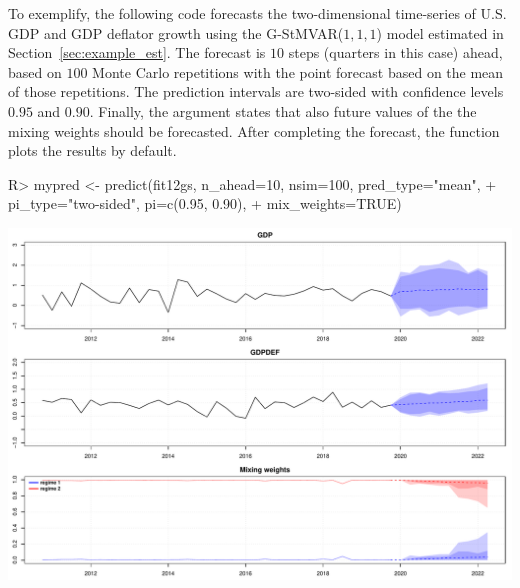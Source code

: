 \documentclass[nojss]{jss} %
\begin{document}
To exemplify, the following code forecasts the two-dimensional time-series of U.S. GDP and GDP deflator growth using the G-StMVAR($1, 1, 1$) model  estimated in Section~\ref{sec:example_est}. The forecast is $10$ steps (quarters in this case) ahead, based on $100$ Monte Carlo repetitions with the point forecast based on the mean of those repetitions. The prediction intervals are two-sided with confidence levels $0.95$ and $0.90$. Finally, the argument  states that also future values of the the mixing weights should be forecasted. After completing the forecast, the function plots the results by default.
%
\begin{Schunk}
\begin{Sinput}
R> mypred <- predict(fit12gs, n_ahead=10, nsim=100, pred_type="mean",
+                    pi_type="two-sided", pi=c(0.95, 0.90),
+                    mix_weights=TRUE)
\end{Sinput}
\end{Schunk}
\includegraphics{gmvarkit-vignette-predict}
%
\end{document}
